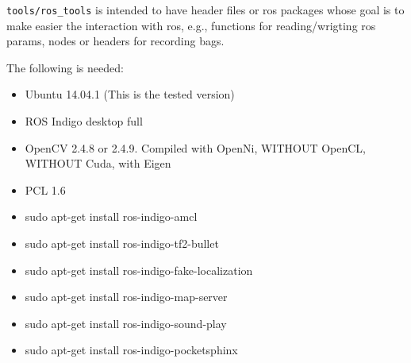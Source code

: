 \documentclass[letterpaper,10pt]{article}
\begin{document}
\texttt{tools/ros\_tools} is intended to have header files or ros packages whose goal is to make easier the interaction with ros, e.g., functions for reading/wrigting ros params, nodes or headers for recording bags. 

The following is needed:
\begin{itemize}
\item Ubuntu 14.04.1 (This is the tested version)
\item ROS Indigo desktop full
\item OpenCV 2.4.8 or 2.4.9. Compiled with OpenNi, WITHOUT OpenCL, WITHOUT Cuda, with Eigen
\item PCL 1.6
\end{itemize}

\begin{itemize}
\item sudo apt-get install ros-indigo-amcl
\item sudo apt-get install ros-indigo-tf2-bullet
\item sudo apt-get install ros-indigo-fake-localization
\item sudo apt-get install ros-indigo-map-server
\item sudo apt-get install ros-indigo-sound-play
\item sudo apt-get install ros-indigo-pocketsphinx
\end{itemize}


\end{document}
